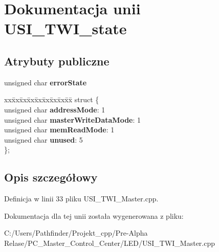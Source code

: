 \hypertarget{union_u_s_i___t_w_i__state}{}\section{Dokumentacja unii U\+S\+I\+\_\+\+T\+W\+I\+\_\+state}
\label{union_u_s_i___t_w_i__state}
\subsection*{Atrybuty publiczne}
\begin{DoxyCompactItemize}
\item 
\mbox{\label{union_u_s_i___t_w_i__state_ab6b1ad0ab46bba6493866fe581869db4}} 
unsigned char {\bfseries error\+State}
\item 
\mbox{\label{union_u_s_i___t_w_i__state_a6c85acff15a47a8ef011136e33092f65}} 
\begin{tabbing}
xx\=xx\=xx\=xx\=xx\=xx\=xx\=xx\=xx\=\kill
struct \{\\
\>unsigned char {\bfseries addressMode}: 1\\
\>unsigned char {\bfseries masterWriteDataMode}: 1\\
\>unsigned char {\bfseries memReadMode}: 1\\
\>unsigned char {\bfseries unused}: 5\\
\}; \\

\end{tabbing}\end{DoxyCompactItemize}


\subsection{Opis szczegółowy}


Definicja w linii 33 pliku U\+S\+I\+\_\+\+T\+W\+I\+\_\+\+Master.\+cpp.



Dokumentacja dla tej unii została wygenerowana z pliku\+:\begin{DoxyCompactItemize}
\item 
C\+:/\+Users/\+Pathfinder/\+Projekt\+\_\+cpp/\+Pre-\/\+Alpha Relase/\+P\+C\+\_\+\+Master\+\_\+\+Control\+\_\+\+Center/\+L\+E\+D/U\+S\+I\+\_\+\+T\+W\+I\+\_\+\+Master.\+cpp\end{DoxyCompactItemize}
